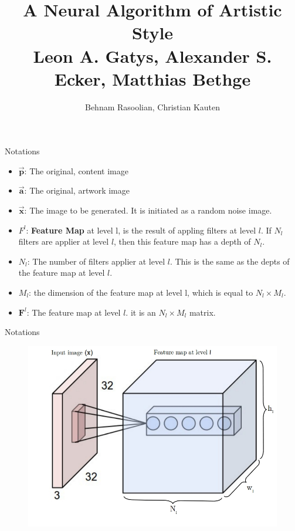 \documentclass{beamer}
\title{A Neural Algorithm of Artistic Style \\ { \tiny Leon A. Gatys, Alexander S. Ecker, Matthias Bethge}}
\author{Behnam Rasoolian, Christian Kauten}
\institute{Auburn University}
\date{}
\begin{document}

\frame{\titlepage}

\begin{frame}{Notations}
    \begin{itemize}
        \item $\mathbf{\overrightarrow{p}}$: The original, content image
        \item $\mathbf{\overrightarrow{a}}$: The original, artwork image
        \item $\mathbf{\overrightarrow{x}}$: The image to be generated. It is
            initiated as a random noise image.
        \item $F^l$: \textbf{Feature Map} at level l, is the result of appling
            filters at level $l$. If $N_l$ filters are applier at level $l$,
            then this feature map has a depth of $N_l$.
        \item $N_l$: The number of filters applier at level $l$. This is
            the same as the depts of the feature map at level
            $l$.
        \item $M_l$: the dimension of the feature map at level l, which
            is equal to $N_l \times M_l$.
        \item $\mathbf{F}^l$: The feature map at level $l$. it is an
            $N_l \times M_l$ matrix.
    \end{itemize}
\end{frame}

\begin{frame}{Notations}
    \begin{figure}[H]
        \centering
        \includegraphics[width=.8\textwidth]{levels.jpg}
    \end{figure}
\end{frame}
\end{document}
